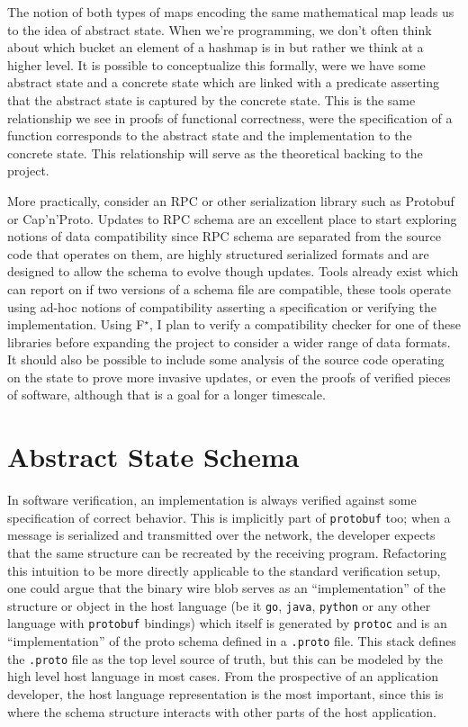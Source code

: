 \documentclass[11pt]{article}
\newcommand{\fstar}{F\(^\star\)}
\begin{document}
The notion of both types of maps encoding the same mathematical map leads us to
the idea of abstract state. When we're programming, we don't often think about
which bucket an element of a hashmap is in but rather we think at a higher
level. It is possible to conceptualize this formally, were we have some abstract
state and a concrete state which are linked with a predicate asserting that the
abstract state is captured by the concrete state. This is the same relationship
we see in proofs of functional correctness, were the specification of a function
corresponds to the abstract state and the implementation to the concrete
state. This relationship will serve as the theoretical backing to the project.

More practically, consider an RPC or other serialization library such as
Protobuf or Cap'n'Proto. Updates to RPC schema are an excellent place to start
exploring notions of data compatibility since RPC schema are separated from the
source code that operates on them, are highly structured serialized formats and
are designed to allow the schema to evolve though updates. Tools already exist
which can report on if two versions of a schema file are compatible, these tools
operate using ad-hoc notions of compatibility asserting a specification or
verifying the implementation. Using \fstar, I plan to verify a compatibility
checker for one of these libraries before expanding the project to consider a
wider range of data formats. It should also be possible to include some analysis
of the source code operating on the state to prove more invasive updates, or
even the proofs of verified pieces of software, although that is a goal for a
longer timescale.

\section{Abstract State Schema}

In software verification, an implementation is always verified against some
specification of correct behavior. This is implicitly part of
\texttt{protobuf} too; when a message is serialized and transmitted over the
network, the developer expects that the same structure can be recreated by the
receiving program. Refactoring this intuition to be more directly applicable to
the standard verification setup, one could argue that the binary wire blob
serves as an ``implementation'' of the structure or object in the host
language (be it \texttt{go}, \texttt{java}, \texttt{python} or any other
language with \texttt{protobuf} bindings) which itself is generated by
\texttt{protoc} and is an ``implementation'' of the proto schema defined in a
\texttt{.proto} file. This stack defines the \texttt{.proto} file as the top
level source of truth, but this can be modeled by the high level host language
in most cases. From the prospective of an application developer, the host
language representation is the most important, since this is where the schema
structure interacts with other parts of the host application.
\end{document}
